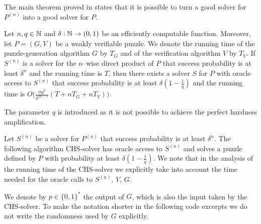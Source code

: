 The main theorem proved in \cite{canetti2004hardness} states that it is possible to turn a good solver for $P^{(n)}$
into a good solver for $P$.
%
\begin{theorem}
  \label{thm:wvp_chs}
Let $n,q \in \mathbb{N}$ and $\delta: \mathbb{N} \rightarrow (0,1)$ be an efficiently computable function.
Moreover, let $P = (G,V)$ be a weakly verifiable puzzle. We denote the running time of the
puzzle-generation algorithm $G$ by $T_G$ and of the verification algorithm $V$ by $T_V$.
If $S^{(n)}$ is a solver for the $n$--wise direct product of $P$ that success probability is at least $\delta^{n}$
and the running time is $T$, then there exists a solver $S$ for $P$ with oracle access to $S^{(n)}$ that success
probability is at least $\delta(1-\frac{1}{q})$ and the running time is $O\Big(\frac{nq^3}{\delta^{2n-1}}(T + nT_G + nT_V)\Big)$.
\end{theorem}
%
The parameter $q$ is introduced as it is not possible to achieve
the perfect hardness amplification.

Let $S^{(n)}$ be a solver for $P^{(n)}$ that success probability is at least $\delta^{n}$.
The following algorithm CHS-solver has oracle access to $S^{(n)}$ and
solves a puzzle defined by $P$ with probability at least $\delta(1  - \frac{1}{q})$.
We note that in the analysis of the running time of the CHS-solver we explicitly take into account the time needed for the oracle calls to $S^{(n)}$, $V$, $G$.

We denote by $p \in \{0,1\}^{*}$ the output of $G$, which is also the input taken by the CHS-solver.
To make the notation shorter in the following code excerpts we do not write the randomness used by $G$ explicitly.

